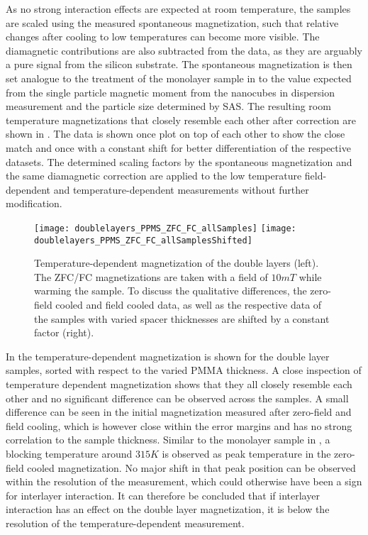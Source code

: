 \documentclass[\main/dresen_thesis.tex]{subfiles}
\begin{document}
    As no strong interaction effects are expected at room temperature, the samples are scaled using the measured spontaneous magnetization, such that relative changes after cooling to low temperatures can become more visible.
    The diamagnetic contributions are also subtracted from the data, as they are arguably a pure signal from the silicon substrate.
    The spontaneous magnetization is then set analogue to the treatment of the monolayer sample in  to the value expected from the single particle magnetic moment from the nanocubes in dispersion measurement and the particle size determined by SAS.
    The resulting room temperature magnetizations that closely resemble each other after correction are shown in .
    The data is shown once plot on top of each other to show the close match and once with a constant shift for better differentiation of the respective datasets.
    The determined scaling factors by the spontaneous magnetization and the same diamagnetic correction are applied to the low temperature field-dependent and temperature-dependent measurements without further modification.



    \begin{figure}[tb]
      \centering
      \texttt{[image: doublelayers\_PPMS\_ZFC\_FC\_allSamples]}
      \texttt{[image: doublelayers\_PPMS\_ZFC\_FC\_allSamplesShifted]}
      \caption{\label{fig:doubleLayers:zfcFCData}Temperature-dependent magnetization of the double layers (left). The ZFC/FC magnetizations are taken with a field of $10 \unit{mT}$ while warming the sample. To discuss the qualitative differences, the zero-field cooled and field cooled data, as well as the respective data of the samples with varied spacer thicknesses are shifted by a constant factor (right).}
    \end{figure}
    In  the temperature-dependent magnetization is shown for the double layer samples, sorted with respect to the varied PMMA thickness.
    A close inspection of temperature dependent magnetization shows that they all closely resemble each other and no significant difference can be observed across the samples.
    A small difference can be seen in the initial magnetization measured after zero-field and field cooling, which is however close within the error margins and has no strong correlation to the sample thickness.
    Similar to the monolayer sample in , a blocking temperature around $315 \unit{K}$ is observed as peak temperature in the zero-field cooled magnetization.
    No major shift in that peak position can be observed within the resolution of the measurement, which could otherwise have been a sign for interlayer interaction.
    It can therefore be concluded that if interlayer interaction has an effect on the double layer magnetization, it is below the resolution of the temperature-dependent measurement.
\end{document}
